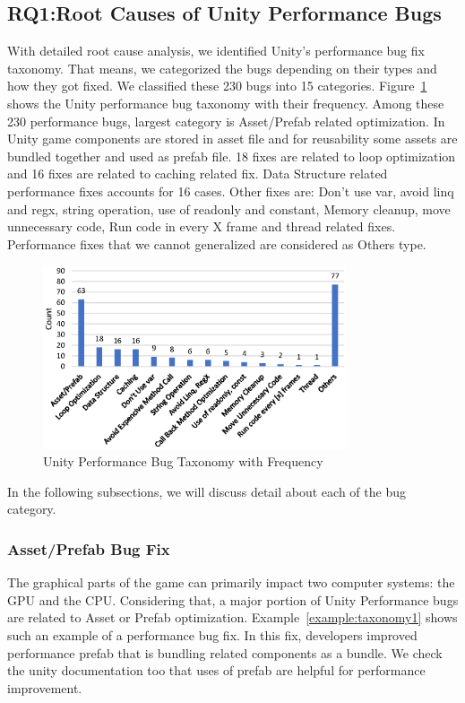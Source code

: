 \subsection{RQ1:Root Causes of Unity Performance Bugs}
\label{subsec:rootcause}
With detailed root cause analysis, we identified Unity's performance bug fix taxonomy. That means, we categorized the bugs depending on their types and how they got fixed. We classified these 230 bugs into 15 categories. Figure~\ref{figure:rq1category} shows the Unity performance bug taxonomy with their frequency. Among these 230 performance  bugs, largest category is Asset/Prefab related optimization. In Unity game components are stored in asset file and for reusability some assets are  bundled together and used as prefab file. 18 fixes are related to loop optimization and 16 fixes are related to caching related fix. Data Structure related performance fixes accounts for 16 cases. Other fixes are: Don't use var, avoid linq and regx, string operation, use of readonly and constant, Memory cleanup, move unnecessary code, Run code in every X frame and thread related fixes. Performance fixes that we cannot generalized are considered as Others type. 


\begin{figure}[t]
	\centering
	\includegraphics[width=0.8\textwidth]{figure/rq1_taxonomy.eps}
	\caption{Unity Performance Bug Taxonomy with Frequency}
	\label{figure:rq1category}
\end{figure}

In the following subsections, we will discuss detail about each of the bug category.

\subsubsection{Asset/Prefab Bug Fix}
The graphical parts of the game can primarily impact two computer systems: the GPU and the CPU. Considering that, a major portion of Unity Performance bugs are related to Asset or Prefab optimization. Example~\ref{example:taxonomy1} shows such an example of a performance bug fix. In this fix, developers improved performance prefab that is bundling related components as a bundle. We check the unity documentation too that uses of prefab are helpful for performance improvement.

